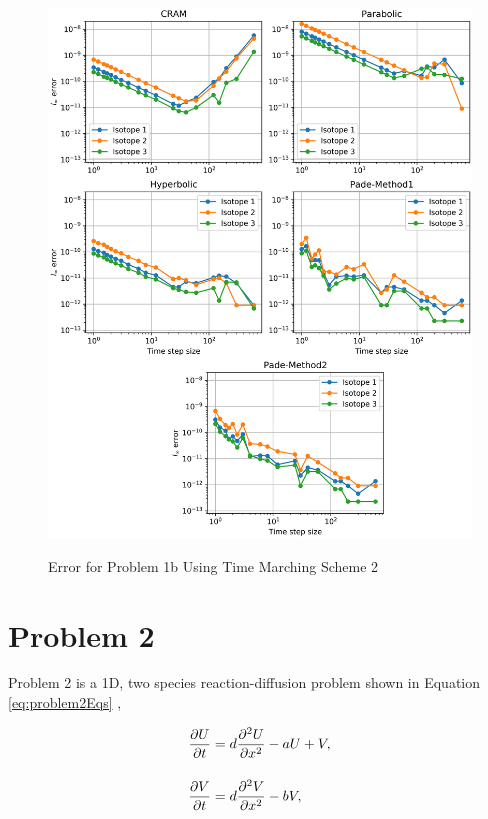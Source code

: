 \begin{figure}[t]
  \centering
  \includegraphics[width=6.5in]{images/problem1bMethod2.png}\\
  \caption{Error for Problem 1b Using Time Marching Scheme 2}
  \label{fig:errorProblem1aTimeMarchingScheme2}
\end{figure} 

\FloatBarrier

\section{Problem 2}
Problem 2 is a 1D, two species reaction-diffusion problem shown in Equation \ref{eq:problem2Eqs} \cite{ching2007},

\begin{equation}
\setlength{\jot}{15pt}
\begin{split}
    \frac{\partial U}{\partial t} &= d\frac{\partial^{2}U}{\partial x^{2}} - aU + V, \\
    \frac{\partial V}{\partial t} &=
    d\frac{\partial^{2}V}{\partial x^{2}} - bV,
\end{split}
    \label{eq:problem2Eqs}
\end{equation}

